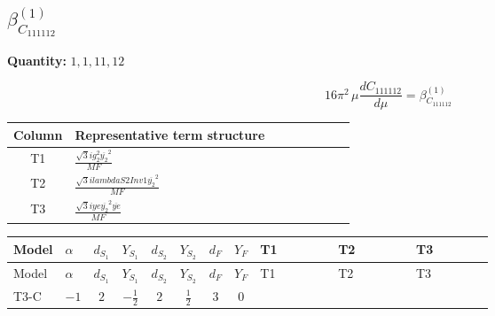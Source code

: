 \documentclass[8pt]{article}
\begin{document}
\begin{landscape}
\section*{$\beta_{C_{111112}}^{(1)}$}
\noindent\textbf{Quantity: }$\mathrm{1,1,11,12}$\par\smallskip
\[16\pi^2\,\mu\frac{d C_{111112}}{d\mu}=\beta_{C_{111112}}^{(1)}\]
\begin{center}
\begin{tabular}{@{}c >{\raggedright\arraybackslash}p{0.82\linewidth}@{}}
\toprule
Column & Representative term structure \\
\midrule
T1 & \(\displaystyle \frac{\sqrt{3} i g_{2}^{2} \overline{y_{2}}^{2}}{MF}\) \\
\midrule
T2 & \(\displaystyle \frac{\sqrt{3} i lambdaS2Inv1 \overline{y_{2}}^{2}}{MF}\) \\
\midrule
T3 & \(\displaystyle \frac{\sqrt{3} i ye \overline{y_{2}}^{2} \overline{ye}}{MF}\) \\
\midrule
\bottomrule
\end{tabular}
\end{center}
\smallskip
\tiny
\begin{longtable}{@{}llcccccc >{\raggedright\arraybackslash}p{0.21\linewidth} >{\raggedright\arraybackslash}p{0.21\linewidth} >{\raggedright\arraybackslash}p{0.21\linewidth}@{}}
\toprule
Model & $\alpha$ & $d_{S_1}$ & $Y_{S_1}$ & $d_{S_2}$ & $Y_{S_2}$ & $d_F$ & $Y_F$ & T1 & T2 & T3 \\
\midrule
\endfirsthead
\toprule
Model & $\alpha$ & $d_{S_1}$ & $Y_{S_1}$ & $d_{S_2}$ & $Y_{S_2}$ & $d_F$ & $Y_F$ & T1 & T2 & T3 \\
\midrule
\endhead
T3-C & $-1$ & $2$ & $-\frac{1}{2}$ & $2$ & $\frac{1}{2}$ & $3$ & $0$ & \scriptsize\adjustbox{max width=\linewidth}{$\begin{gathered} - \frac{\sqrt{3} i g_{2}^{2} \overline{y_{2}}^{2}}{4 MF}\end{gathered}$} & \scriptsize\adjustbox{max width=\linewidth}{$\begin{gathered} - \frac{\sqrt{3} i lambdaS2Inv1 \overline{y_{2}}^{2}}{6 MF}\end{gathered}$} & \scriptsize\adjustbox{max width=\linewidth}{$\begin{gathered} \frac{\sqrt{3} i ye \overline{y_{2}}^{2} \overline{ye}}{12 MF}\end{gathered}$} \\
\midrule
\bottomrule
\end{longtable}
\clearpage

\end{landscape}
\end{document}

